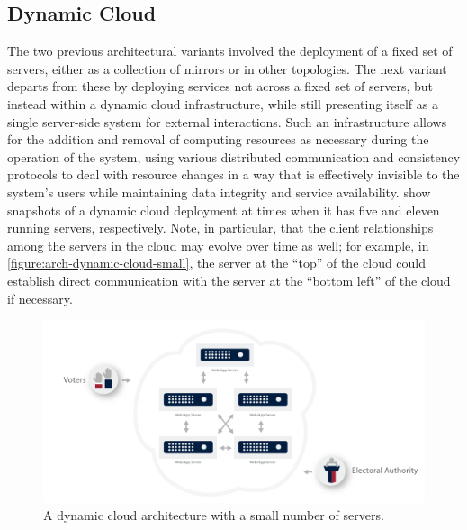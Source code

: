 \subsection{Dynamic Cloud}

The two previous architectural variants involved the deployment of a
fixed set of servers, either as a collection of mirrors or in other
topologies. The next variant departs from these by deploying services
not across a fixed set of servers, but instead within a dynamic cloud
infrastructure, while still presenting itself as a single server-side
system for external interactions. Such an infrastructure allows for
the addition and removal of computing resources as necessary during
the operation of the system, using various distributed communication
and consistency protocols to deal with resource changes in a way that
is effectively invisible to the system's users while maintaining data
integrity and service
availability.  show snapshots of a dynamic cloud
deployment at times when it has five and eleven running servers,
respectively. Note, in particular, that the client relationships among
the servers in the cloud may evolve over time as well; for example, in
\autoref{figure:arch-dynamic-cloud-small}, the server at the ``top''
of the cloud could establish direct communication with the server at
the ``bottom left'' of the cloud if necessary.

\begin{figure}[p]
\begin{center}
\includegraphics[width=6.5in]{architecture_resources/dynamic-cloud-small.pdf}
\end{center}
\caption{A dynamic cloud architecture with a small number of servers.}
\label{figure:arch-dynamic-cloud-small}
\end{figure}

